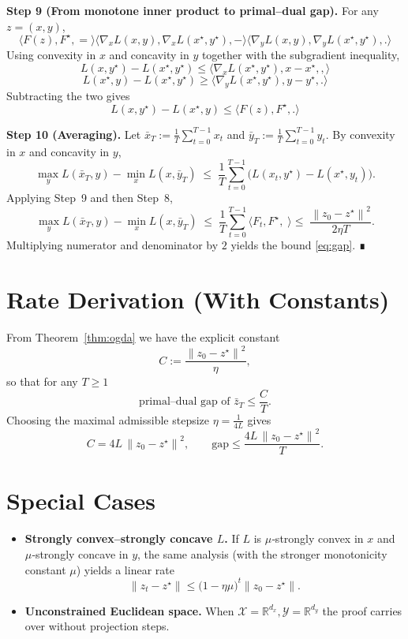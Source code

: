 \documentclass{article}
\newcommand{\R}{\mathbb{R}}
\newcommand{\norm}[1]{\left\|#1\right\|}
\newcommand{\ip}[2]{\langle #1,#2\rangle}
\begin{document}
\noindent\textbf{Step 9 (From monotone inner product to primal–dual gap).}
For any $z=(x,y)$,
\[
    \ip{F(z),F^\star}= \ip{\nabla_x L(x,y),\nabla_x L(x^\star,y^\star)}
                     -\ip{\nabla_y L(x,y),\nabla_y L(x^\star,y^\star)}.
\]
Using convexity in $x$ and concavity in $y$ together with the subgradient inequality,
\[
    L(x,y^\star)-L(x^\star,y^\star)\le \ip{\nabla_x L(x^\star,y^\star),x-x^\star},
\]
\[
    L(x^\star,y)-L(x^\star,y^\star)\ge \ip{\nabla_y L(x^\star,y^\star),y-y^\star}.
\]
Subtracting the two gives
\[
    L(x,y^\star)-L(x^\star,y)\le \ip{F(z),F^\star}. \tag{Step 9}
\]

\noindent\textbf{Step 10 (Averaging).}
Let $\bar x_T:=\frac{1}{T}\sum_{t=0}^{T-1}x_t$ and $\bar y_T:=\frac{1}{T}\sum_{t=0}^{T-1}y_t$.  By convexity in $x$ and concavity in $y$,
\[
    \max_{y}L(\bar x_T,y)-\min_{x}L(x,\bar y_T)
    \;\le\; \frac{1}{T}\sum_{t=0}^{T-1}\bigl(L(x_t,y^\star)-L(x^\star,y_t)\bigr).
\]
Applying Step~9 and then Step~8,
\[
    \max_{y}L(\bar x_T,y)-\min_{x}L(x,\bar y_T)
    \;\le\; \frac{1}{T}\sum_{t=0}^{T-1}\ip{F_t,F^\star}
    \;\le\; \frac{\norm{z_0-z^\star}^2}{2\eta T}.
\]
Multiplying numerator and denominator by $2$ yields the bound \eqref{eq:gap}.  ∎

\section*{Rate Derivation (With Constants)}
From Theorem~\ref{thm:ogda} we have the explicit constant
\[
    C:=\frac{\norm{z_0-z^\star}^2}{\eta},
\]
so that for any $T\ge1$
\[
    \text{primal–dual gap of }\bar z_T\le \frac{C}{T}.
\]
Choosing the maximal admissible stepsize $\eta=\frac{1}{4L}$ gives
\[
    C = 4L\,\norm{z_0-z^\star}^2,
\qquad
    \text{gap}\le \frac{4L\,\norm{z_0-z^\star}^2}{T}.
\]

\section*{Special Cases}
\begin{itemize}
    \item \textbf{Strongly convex–strongly concave $L$.} If $L$ is $\mu$‑strongly convex in $x$ and $\mu$‑strongly concave in $y$, the same analysis (with the stronger monotonicity constant $\mu$) yields a linear rate
    \[
        \norm{z_t-z^\star}\le \bigl(1-\eta\mu\bigr)^t\norm{z_0-z^\star}.
    \]
    \item \textbf{Unconstrained Euclidean space.} When $\mathcal X=\R^{d_x},\mathcal Y=\R^{d_y}$ the proof carries over without projection steps.
\end{itemize}
\end{document}
